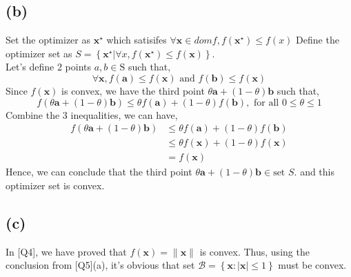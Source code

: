 \documentclass[12pt, a4 paper]{article}
\begin{document}
\begin{framed}
        \subsection{(b)}
            Set the optimizer as $\boldsymbol{x^{\star}}$ which satisifes $\forall \boldsymbol{x}
             \in dom f, f(\boldsymbol{x^{\star}}) \leq f(x)$
            Define the optimizer set as $S = \left\{ \boldsymbol{x^{\star}} | \forall x
            , f(\boldsymbol{x^{\star}}) \leq f(\boldsymbol{x}) \right\} $.\\
            \indent Let's define 2 points $a, b \in \text{S}$ such that,
            $$
            \forall \boldsymbol{x}, f(\boldsymbol{a}) \leq f(\boldsymbol{x})
             \text{ and } f(\boldsymbol{b}) \leq f(\boldsymbol{x})
            $$ 
            \indent Since $f(\boldsymbol{x})$ is convex, we have the third point $\theta \boldsymbol{a} 
            + (1-\theta) \boldsymbol{b}$ such that,
            $$
            f(\theta \boldsymbol{a} + (1-\theta) \boldsymbol{b}) \leq \theta f(\boldsymbol{a}) + 
            (1-\theta) f(\boldsymbol{b}), \text{ for all } 0 \leq \theta \leq 1
            $$
            \indent Combine the 3 inequalities, we can have,
            \begin{align}
                f(\theta \boldsymbol{a} + (1-\theta) \boldsymbol{b}) &\leq \theta f(\boldsymbol{a}) + 
                (1-\theta) f(\boldsymbol{b}) \\
                &\leq \theta f(\boldsymbol{x}) + (1-\theta) f(\boldsymbol{{x}}) \\
                &= f(\boldsymbol{x})
            \end{align}
            \indent Hence, we can conclude that the third point $\theta \boldsymbol{a} 
            + (1-\theta) \boldsymbol{b} \in \text{set } S.$ and this optimizer set is convex.

        \subsection{(c)}
            In [Q4], we have proved that $f(\boldsymbol{x}) = \lVert \boldsymbol{x} \rVert$ is
             convex. Thus, using the conclusion from [Q5](a), it's obvious that set $\mathcal{B} = \left\{ 
                \boldsymbol{x}: \lvert \boldsymbol{x} \rvert \leq 1
        \right\}$ must be convex. 


\end{framed}
\end{document}
